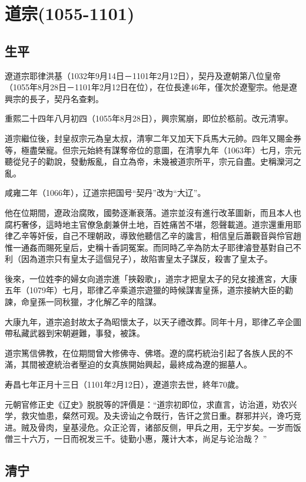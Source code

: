 
\section{道宗\tiny(1055-1101)}

\subsection{生平}

遼道宗耶律洪基（1032年9月14日－1101年2月12日），契丹及遼朝第八位皇帝（1055年8月28日－1101年2月12日在位），在位長達46年，僅次於遼聖宗。他是遼興宗的長子，契丹名查剌。

重熙二十四年八月初四（1055年8月28日），興宗駕崩，即位於柩前。改元清寧。

道宗繼位後，封皇叔宗元為皇太叔，清寧二年又加天下兵馬大元帥。四年又賜金券等，極盡榮寵。但宗元始終有謀奪帝位的意圖，在清寧九年（1063年）七月，宗元聽從兒子的勸說，發動叛亂，自立為帝，未幾被道宗所平，宗元自盡。史稱灤河之亂。

咸雍二年（1066年），辽道宗把国号“契丹”改为“大辽”。

他在位期間，遼政治腐敗，國勢逐漸衰落。道宗並沒有進行改革圖新，而且本人也腐朽奢侈，這時地主官僚急劇兼併土地，百姓痛苦不堪，怨聲載道。道宗還重用耶律乙辛等奸佞，自己不理朝政，導致他聽信乙辛的讒言，相信皇后蕭觀音與伶官趙惟一通姦而賜死皇后，史稱十香詞冤案。而同時乙辛為防太子耶律濬登基對自己不利（因為道宗只有皇太子這個兒子），故陷害皇太子謀反，殺害了皇太子。

後來，一位姓李的婦女向道宗進「挾穀歌」，道宗才把皇太子的兒女接進宮，大康五年（1079年）七月，耶律乙辛乘道宗遊獵的時候謀害皇孫，道宗接納大臣的勸諫，命皇孫一同秋獵，才化解乙辛的陰謀。

大康九年，道宗追封故太子為昭懷太子，以天子禮改葬。同年十月，耶律乙辛企圖帶私藏武器到宋朝避難，事發，被誅。

道宗篤信佛教，在位期間曾大修佛寺、佛塔。遼的腐朽統治引起了各族人民的不滿，其間被遼統治者壓迫的女真族開始興起，最終成為遼的掘墓人。

寿昌七年正月十三日（1101年2月12日），遼道宗去世，終年70歲。

元朝官修正史《辽史》脱脱等的評價是：“道宗初即位，求直言，访治道，劝农兴学，救灾恤患，粲然可观。及夫谤讪之令既行，告讦之赏日重。群邪并兴，谗巧竞进。贼及骨肉，皇基浸危。众正沦胥，诸部反侧，甲兵之用，无宁岁矣。一岁而饭僧三十六万，一日而祝发三千。徒勤小惠，蔑计大本，尚足与论治哉？ ”

\subsection{清宁}

